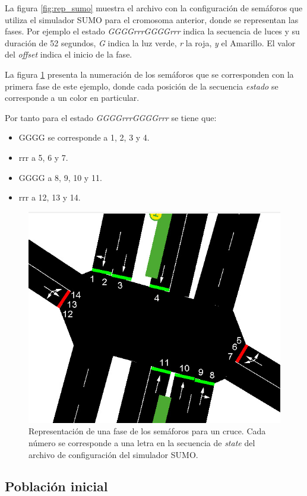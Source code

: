 La figura \ref{fig:rep_sumo} muestra el archivo con la configuración de semáforos que utiliza el simulador SUMO para el cromosoma anterior, donde se representan las fases. Por ejemplo el estado \emph{GGGGrrrGGGGrrr} indica la secuencia de luces y su duración de 52 segundos, \emph{G} indica la luz verde, \emph{r} la roja, \emph{y} el Amarillo. El valor del \emph{offset} indica el inicio de la fase. 

La figura \ref{fig:sem_numerados} presenta la numeración de los semáforos que se corresponden con la primera fase de este ejemplo, donde cada posición de la secuencia \emph{estado} se corresponde a un color en particular. 

\newpage
Por tanto para el estado \emph{GGGGrrrGGGGrrr} se tiene que:
\begin{itemize}
\item GGGG se corresponde a 1, 2, 3 y 4. 
\item rrr a 5, 6 y 7. 
\item GGGG a 8, 9, 10 y 11. 
\item rrr a 12, 13 y 14. 
\end{itemize}
  
\begin{figure}[H]
	\centering
	\includegraphics[width=0.7\linewidth]{Figures/semaforos_numerado}
	\caption[Representación de una fase de los semáforos para un cruce.]{Representación de una fase de los semáforos para un cruce. Cada número se corresponde a una letra en la secuencia de \emph{state} del archivo de configuración del simulador SUMO.}
	\label{fig:sem_numerados}
\end{figure}

\subsection{Población inicial}

